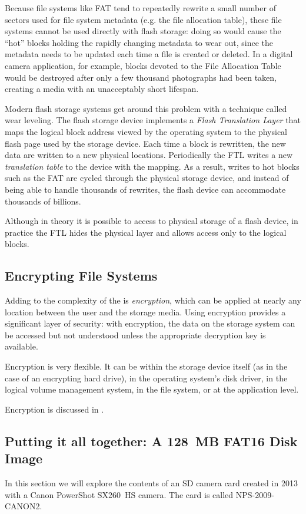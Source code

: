 Because file systems like FAT tend to repeatedly rewrite a small
number of sectors used for file system metadata (e.g. the file
allocation table), these file systems cannot be used directly with
flash storage: doing so would cause the ``hot'' blocks holding the
rapidly changing metadata to wear out, since the metadata needs to be
updated each time a file is created or deleted. In a digital camera
application, for example, blocks devoted to the File Allocation Table
would be destroyed after only a few thousand photographs had been
taken, creating a media with an unacceptably short lifespan.

Modern flash storage systems get around this problem with a technique
called wear leveling. The flash storage device implements a
\emph{Flash Translation Layer} that maps the logical block address
viewed by the operating system to the physical flash page used by the
storage device. Each time a block is rewritten, the new data are
written to a new physical locations. Periodically
the FTL writes a new \emph{translation table} to the device with the
mapping. As a result, writes to hot blocks such as the FAT are cycled
through the physical storage device, and instead of being able to
handle thousands of rewrites, the flash device can accommodate 
thousands of billions. 

Although in theory it is possible to access to physical storage of a
flash device, in practice the FTL hides the physical layer and allows
access only to the logical blocks.

\subsection{Encrypting File Systems}

Adding to the complexity of the is \emph{encryption}, which can be
applied at nearly any location between the user and the storage
media. Using encryption provides a significant layer of security: with
encryption, the data on the storage system can be accessed but not
understood unless the appropriate decryption key is available.

Encryption is very flexible. It can be within the storage device itself (as in the case of an
encrypting hard drive), in the operating system's disk driver, in the logical volume
management system, in the file system, or at the application level. 

Encryption is discussed in .


\subsection{Putting it all together: A 128~MB FAT16 Disk Image}
In this section we will explore the contents of an SD camera card
created in 2013 with a Canon PowerShot SX260~HS camera. The card is called NPS-2009-CANON2.


